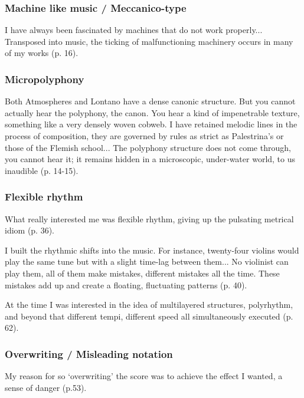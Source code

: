 \documentclass[a4paper,11pt]{article}
\begin{document}
\subsubsection{Machine like music / Meccanico-type}
\label{subs:ligeti:machine}

I have always been fascinated by machines that do not work properly...
Transposed into music, the ticking of malfunctioning machinery occurs in many of my works (p. 16).

\subsubsection{Micropolyphony}
\label{subs:ligeti:micropolyphony}

Both Atmospheres and Lontano have a dense canonic structure.
But you cannot actually hear the polyphony, the canon.
You hear a kind of impenetrable texture, something like a very densely woven cobweb.
I have retained melodic lines in the process of composition, they are governed by rules as strict as Palestrina’s or those of the Flemish school...
The polyphony structure does not come through, you cannot hear it; it remains hidden in a microscopic, under-water world, to us inaudible (p. 14-15).

\subsubsection{Flexible rhythm}
\label{subs:ligeti:flexible}

What really interested me was flexible rhythm, giving up the pulsating metrical idiom (p. 36).

I built the rhythmic shifts into the music.
For instance, twenty-four violins would play the same tune but with a slight time-lag between them...
No violinist can play them, all of them make mistakes, different mistakes all the time.
These mistakes add up and create a floating, fluctuating patterns (p. 40).

At the time I was interested in the idea of multilayered structures, polyrhythm, and beyond that different tempi, different speed all simultaneously executed (p. 62).

\subsubsection{Overwriting / Misleading notation}
\label{subs:ligeti:overwriting}

My reason for so ‘overwriting’ the score was to achieve the effect I wanted, a sense of danger (p.53).
\end{document}
